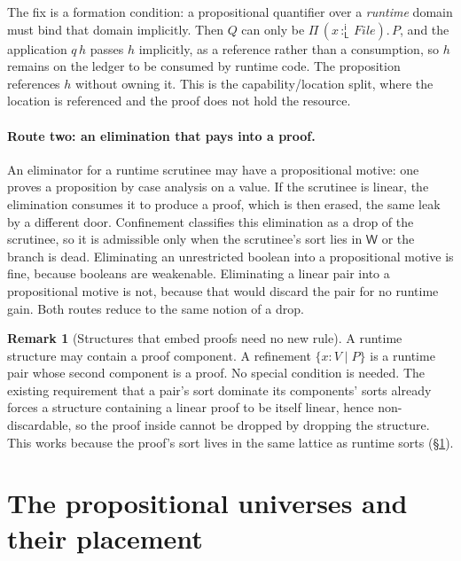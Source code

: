 \documentclass[11pt]{article}
\newcommand{\Wk}{\mathsf{W}}
\newcommand{\im}{\mathsf{i}}                      %
\newcommand{\bind}[3]{#1\,{:}^{#2}_{#3}\,}        %
\newcommand{\Pifn}[4]{\Pi\,(\bind{#1}{#2}{#3}#4).\,}
\theoremstyle{definition}
\newtheorem{remark}[definition]{Remark}
\theoremstyle{plain}
\begin{document}
The fix is a formation condition: a propositional quantifier over a
\emph{runtime} domain must bind that domain implicitly. Then $Q$ can only be
$\Pifn{x}{\im}{\mathsf{L}}{\mathit{File}}P$, and the application $q\,h$ passes $h$
implicitly, as a reference rather than a consumption, so $h$ remains on the ledger
to be consumed by runtime code. The proposition references $h$ without owning it.
This is the capability/location split, where the location is referenced and the
proof does not hold the resource.

\paragraph{Route two: an elimination that pays into a proof.}
An eliminator for a runtime scrutinee may have a propositional motive: one proves
a proposition by case analysis on a value. If the scrutinee is linear, the
elimination consumes it to produce a proof, which is then erased, the same leak by
a different door. Confinement classifies this elimination as a drop of the
scrutinee, so it is admissible only when the scrutinee's sort lies in $\Wk$ or the
branch is dead. Eliminating an unrestricted boolean into a propositional motive is
fine, because booleans are weakenable. Eliminating a linear pair into a
propositional motive is not, because that would discard the pair for no runtime
gain. Both routes reduce to the same notion of a drop.

\begin{remark}[Structures that embed proofs need no new rule]
A runtime structure may contain a proof component. A refinement $\{x:V \mid P\}$
is a runtime pair whose second component is a proof. No special condition is
needed. The existing requirement that a pair's sort dominate its components'
sorts already forces a structure containing a linear proof to be itself linear,
hence non-discardable, so the proof inside cannot be dropped by dropping the
structure. This works because the proof's sort lives in the same lattice as
runtime sorts (\S\ref{sec:universe}).
\end{remark}

\section{The propositional universes and their placement}\label{sec:universe}
\end{document}

